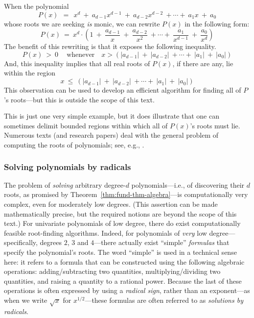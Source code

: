 \smallskip

When the polynomial
\[ P(x) \ \ = \ \ x^d \ + \ a_{d-1} x^{d-1} \ + \ a_{d-2} x^{d-2} \ + \cdots + \ a_1 x \ + \ a_0 \]
whose roots we are seeking {\em is} monic, we can rewrite $P(x)$ in the following form:
\[ P(x) \ = \ 
x^d \cdot \left( 1 \ + \ \frac{a_{d-1}}{x} \ + \ \frac{a_{d-2}}{x^2} \ + \cdots + \ \frac{a_1}{x^{d-1}} \ + \ \frac{a_0}{x^d} \right)
\]
The benefit of this rewriting is that it exposes the following inequality.
\begin{equation}
\label{eq;bound-monic-roots}
P(x) \ > \ 0 \ \ \ \ \mbox{ whenever } \ \ \ x >
 \left(|a_{d-1}| \ + \ |a_{d-2}| \ + \cdots + \ |a_1| \ + \ |a_0| \right)
\end{equation}
And, this inequality implies that all real roots of $P(x)$, if there are any, lie within the region
\[ x \ \leq \ \left(|a_{d-1}| \ + \ |a_{d-2}| \ + \cdots + \ |a_1| \ + \ |a_0| \right) \]
This observation can be used to develop an efficient algorithm for finding all of $P$'s roots---but this is outside the scope of this text.

\medskip

This is just one very simple example, but it does illustrate that one can sometimes delimit bounded regions within which all of $P(x)$'s roots must lie.  Numerous texts (and research papers) deal with the general problem of computing the roots of polynomials; see, e.g., \cite{MacDuffee}.


\subsubsection{Solving polynomials by radicals}
\label{sec:poly-by-radical}

The problem of {\it solving} arbitrary degree-$d$ polynomials---i.e., of discovering their $d$ roots, as promised by Theorem~\ref{thm:fund-thm-algebra}---is computationally very complex, even for moderately low degrees.  (This assertion can be made mathematically precise, but the required notions are beyond the scope of this text.)  For univariate polynomials of low degree, there do exist computationally feasible root-finding algorithms.  Indeed, for polynomials of {\em very} low degree---specifically, degrees $2$, $3$ and $4$---there actually exist ``simple'' {\em formulas} that specify the polynomial's roots.  The word ``simple'' is used in a technical sense here: it refers to a formula that can be constructed using the following algebraic operations: adding/subtracting two quantities, multiplying/dividing two quantities, and raising a quantity to a rational power.  Because the last of these operations is often expressed by using a {\em radical sign}, rather than an exponent---as when we write $\sqrt{x}$ for $x^{1/2}$---these formulas are often referred to as {\it solutions by radicals}.  
\index{solution by radicals}  \index{radical sign}

